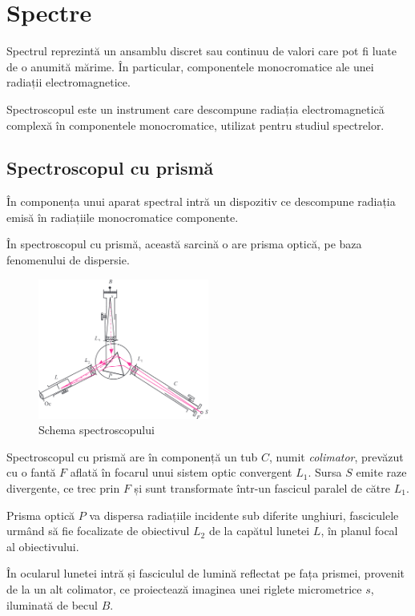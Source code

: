 \section{Spectre}

Spectrul reprezintă un ansamblu discret sau continuu de valori care pot fi
luate de o anumită mărime. În particular, componentele monocromatice ale unei
radiații electromagnetice.

Spectroscopul este un instrument care descompune radiația electromagnetică
complexă în componentele monocromatice, utilizat pentru studiul spectrelor.

\subsection{Spectroscopul cu prismă}

În componența unui aparat spectral intră un dispozitiv ce descompune radiația
emisă în radiațiile monocromatice componente.

În spectroscopul cu prismă, această sarcină o are prisma optică, pe baza
fenomenului de dispersie.

\begin{figure}
    \includegraphics[width=0.5\textwidth]{fig/spectroscop}
    \caption{Schema spectroscopului}
\end{figure}

Spectroscopul cu prismă are în componență un tub $C$, numit \emph{colimator},
prevăzut cu o fantă $F$ aflată în focarul unui sistem optic convergent $L_1$.
Sursa $S$ emite raze divergente, ce trec prin $F$ și sunt transformate într-un
fascicul paralel de către $L_1$.

Prisma optică $P$ va dispersa radiațiile incidente sub diferite unghiuri,
fasciculele urmând să fie focalizate de obiectivul $L_2$ de la capătul lunetei
$L$, în planul focal al obiectivului.

În ocularul lunetei intră și fasciculul de lumină reflectat pe fața prismei,
provenit de la un alt colimator, ce proiectează imaginea unei riglete
micrometrice $s$, iluminată de becul $B$.

